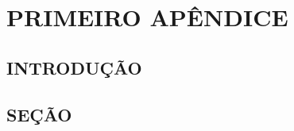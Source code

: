 \artigofalse
\chapter{PRIMEIRO APÊNDICE}
\label{anex:apendiceA}

\tocless\section{INTRODUÇÃO}

\blindtext[3]

\tocless\section{SEÇÃO}

\blindtext[3]
